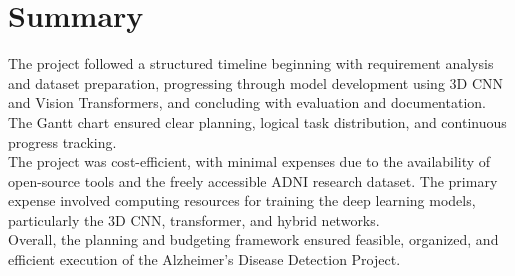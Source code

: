 \section{Summary}
The project followed a structured timeline beginning with requirement analysis and dataset preparation, progressing through model development using 3D CNN and Vision Transformers, and concluding with evaluation and documentation. The Gantt chart ensured clear planning, logical task distribution, and continuous progress tracking.\\
The project was cost-efficient, with minimal expenses due to the availability of open-source tools and the freely accessible ADNI research dataset. The primary expense involved computing resources for training the deep learning models, particularly the 3D CNN, transformer, and hybrid networks.\\
Overall, the planning and budgeting framework ensured feasible, organized, and efficient execution of the Alzheimer’s Disease Detection Project.



